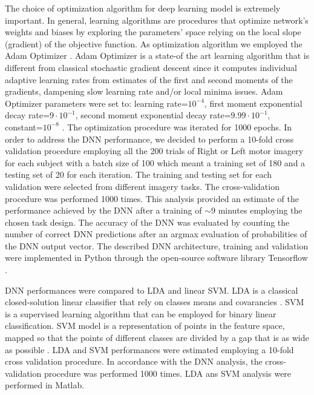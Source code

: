 \documentclass[12pt]{iopart}
\begin{document}
 The choice of optimization algorithm for deep learning model is extremely important.
 In general, learning algorithms are procedures that optimize network's weights and biases by exploring the parameters' space relying  on the local  slope (gradient) of the objective function.  
 As optimization algorithm we employed the Adam Optimizer \parencite{kingma2014adam}.
Adam Optimizer is a state-of the art learning algorithm that is different from classical stochastic gradient descent since it computes individual adaptive learning rates from estimates of the first and second moments of the gradients, dampening slow learning rate and/or local minima issues.
Adam Optimizer parameters were set to: learning rate=$10^{-4}$, first moment exponential decay rate=$9\cdot 10^{-1}$,  second moment exponential decay rate=$9.99\cdot 10^{-1}$, constant=$10^{-8}$ \parencite{kingma2014adam}.
The optimization procedure was iterated for 1000 epochs.
In order to address the DNN performance, we decided to perform a 10-fold cross validation procedure \parencite{kohavi1995study} employing all the 200 trials of Right or Left motor imagery for each subject with a batch size of 100 which meant a training set of 180 and a testing set of 20 for each iteration. 
The training and testing set for each validation were selected from different imagery tasks.
The cross-validation procedure was performed 1000 times. 
This analysis provided an estimate of the performance achieved by the DNN after a training of $\sim$9 minutes employing the chosen task design. 
The accuracy of the DNN was evaluated by counting the number of correct DNN predictions after an argmax evaluation of probabilities of the DNN output vector.
The described DNN architecture, training and validation were implemented in Python  through the open-source software library Tensorflow \parencite{abadi2016tensorflow}.

DNN performances were compared to LDA and linear SVM.
LDA is a classical closed-solution linear classifier that rely on classes means and covarancies \parencite{balakrishnama1998linear}.
SVM is a supervised learning algorithm that can be employed for binary linear classification. SVM model is a representation of  points in the feature space, mapped so that the points of different classes are divided by a gap that is as wide as possible \parencite{cortes1995support}.
LDA and SVM performances were estimated employing  a 10-fold cross validation procedure. In accordance with the DNN analysis,  the cross-validation procedure was performed 1000 times. 
LDA ans SVM analysis were performed in Matlab.
\end{document}
